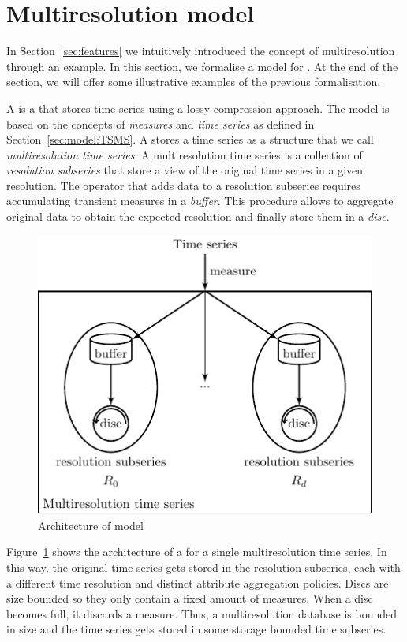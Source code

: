 \section{Multiresolution model}
\label{sec:MTSMS}

In Section~\ref{sec:features} we intuitively introduced the concept of
multiresolution through an example. In this section, we formalise a
model for . At the end of the section, we will offer some
illustrative examples of the previous formalisation.

A  is a  that stores time series using a lossy
compression approach. The  model is based on the concepts
of \emph{measures} and \emph{time series} as defined in
Section~\ref{sec:model:TSMS}.  A  stores a time series as
a structure that we call \emph{multiresolution time series}. A
multiresolution time series is a collection of \emph{resolution
  subseries} that store a view of the original time series in a given
resolution. The operator that adds data to a resolution subseries
requires accumulating transient measures in a \emph{buffer}. This
procedure allows to aggregate original data to obtain the expected
resolution and finally store them in a \emph{disc}.


\begin{figure}
  \centering
  \includegraphics{fig_model_mtsdb.pdf}
  \caption{Architecture of  model}
  \label{fig:model:mtsdb}
\end{figure}

Figure~\ref{fig:model:mtsdb} shows the architecture of a 
for a single multiresolution time series. In this way, the original
time series gets stored in the resolution subseries, each with a
different time resolution and distinct attribute aggregation
policies. Discs are size bounded so they only contain a fixed amount
of measures. When a disc becomes full, it discards a measure. Thus, a
multiresolution database is bounded in size and the time series gets
stored in some storage bounded time subseries.

